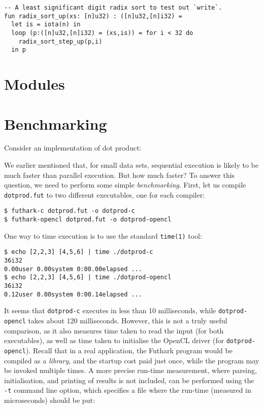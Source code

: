 \documentclass[11pt]{book}
\begin{document}
\begin{lstlisting}
-- A least significant digit radix sort to test out `write`.
fun radix_sort_up(xs: [n]u32) : ([n]u32,[n]i32) =
  let is = iota(n) in
  loop (p:([n]u32,[n]i32) = (xs,is)) = for i < 32 do
    radix_sort_step_up(p,i)
  in p
\end{lstlisting}


\section{Modules}
\label{sec:modules}

\section{Benchmarking}
\label{sec:benchmarking}

Consider an implementation of dot product:



We earlier mentioned that, for small data sets, sequential execution
is likely to be much faster than parallel execution.  But how much
faster?  To answer this question, we need to perform some simple
\textit{benchmarking}.  First, let us compile \texttt{dotprod.fut} to
two different executables, one for each compiler:

\begin{verbatim}
$ futhark-c dotprod.fut -o dotprod-c
$ futhark-opencl dotprod.fut -o dotprod-opencl
\end{verbatim}

One way to time execution is to use the standard \texttt{time(1)}
tool:

\begin{verbatim}
$ echo [2,2,3] [4,5,6] | time ./dotprod-c
36i32
0.00user 0.00system 0:00.00elapsed ...
$ echo [2,2,3] [4,5,6] | time ./dotprod-opencl
36i32
0.12user 0.00system 0:00.14elapsed ...
\end{verbatim}

It seems that \texttt{dotprod-c} executes in less than 10
milliseconds, while \texttt{dotprod-opencl} takes about 120
milliseconds.  However, this is not a truly useful comparison, as it
also measures time taken to read the input (for both executables), as
well as time taken to initialise the OpenCL driver (for
\texttt{dotprod-opencl}).  Recall that in a real application, the
Futhark program would be compiled as a \textit{library}, and the
startup cost paid just once, while the program may be invoked multiple
times.  A more precise run-time measurement, where parsing,
initialisation, and printing of results is not included, can be
performed using the \texttt{-t} command line option, which specifies a
file where the run-time (measured in microseconds) should be put:
\end{document}
